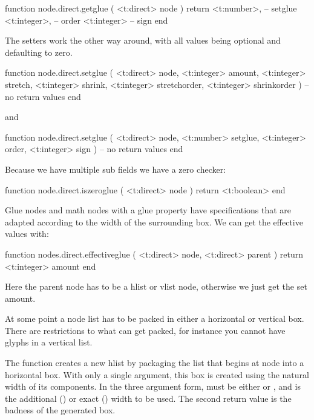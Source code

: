 \starttyping[option=LUA]
function node.direct.getglue ( <t:direct> node )
    return
        <t:number>,  -- setglue
        <t:integer>, -- order
        <t:integer>  -- sign
end
\stoptyping

The setters work the other way around, with all values being optional and
defaulting to zero.

\starttyping[option=LUA]
function node.direct.setglue (
    <t:direct>  node,
    <t:integer> amount,
    <t:integer> stretch,
    <t:integer> shrink,
    <t:integer> stretchorder,
    <t:integer> shrinkorder
)
   -- no return values
end
\stoptyping

and

\starttyping[option=LUA]
function node.direct.setglue (
    <t:direct>  node,
    <t:number>  setglue,
    <t:integer> order,
    <t:integer> sign
)
   -- no return values
end
\stoptyping

Because we have multiple sub fields we have a zero checker:

\starttyping[option=LUA]
function node.direct.iszeroglue ( <t:direct> node ) return <t:boolean> end
\stoptyping

Glue nodes and math nodes with a glue property have specifications that
are adapted according to the width of the surrounding box. We can get the
effective values with:

\starttyping[option=LUA]
function nodes.direct.effectiveglue (
    <t:direct> node,
    <t:direct> parent
)
    return <t:integer> amount
end
\stoptyping

Here the parent node has to be a hlist or vlist node, otherwise we just get the
set amount.

\stopsubsection

\startsubsection[title=Packaging and dimensions]

At some point a node list has to be packed in either a horizontal or vertical
box. There are restrictions to what can get packed, for instance you cannot have
glyphs in a vertical list.


The  function creates a new hlist by packaging the list that begins
at node  into a horizontal box. With only a single argument, this box is
created using the natural width of its components. In the three argument form,
 must be either  or , and 
is the additional () or exact () width to be
used. The second return value is the badness of the generated box.

